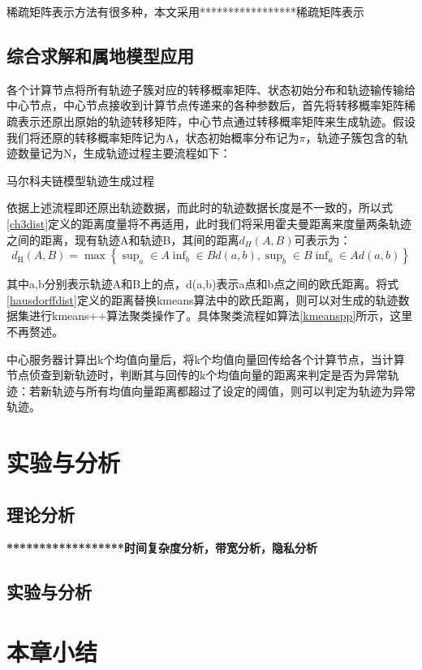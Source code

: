 稀疏矩阵表示方法有很多种，本文采用*****************稀疏矩阵表示


\subsection{综合求解和属地模型应用}
各个计算节点将所有轨迹子簇对应的转移概率矩阵、状态初始分布和轨迹输传输给中心节点，中心节点接收到计算节点传递来的各种参数后，首先将转移概率矩阵稀疏表示还原出原始的轨迹转移矩阵，中心节点通过转移概率矩阵来生成轨迹。假设我们将还原的转移概率矩阵记为A，状态初始概率分布记为$\pi$，轨迹子簇包含的轨迹数量记为N，生成轨迹过程主要流程如下：\\
\begin{algorithm}[H]
	 \caption{马尔科夫链模型轨迹生成过程}
\end{algorithm}

依据上述流程即还原出轨迹数据，而此时的轨迹数据长度是不一致的，所以式\ref{ch3dist}定义的距离度量将不再适用，此时我们将采用霍夫曼距离来度量两条轨迹之间的距离，现有轨迹A和轨迹B，其间的距离$d_H(A,B)$可表示为：
\begin{equation}
\label{hausdorffdist}
d_{\text{H}}\left( A,B \right) =\max \left\{ \mathop{\text{sup}}_a\in A\mathop{\text{inf}}_b\in Bd\left( a,b \right) ,\mathop{\text{sup}}_b\in B\mathop{\text{inf}}_a\in Ad\left( a,b \right) \right\} 
\end{equation}

其中a,b分别表示轨迹A和B上的点，d(a,b)表示a点和b点之间的欧氏距离。将式\ref{hausdorffdist}定义的距离替换kmeans算法中的欧氏距离，则可以对生成的轨迹数据集进行kmeans++算法聚类操作了。具体聚类流程如算法\ref{kmeanspp}所示，这里不再赘述。


中心服务器计算出k个均值向量后，将k个均值向量回传给各个计算节点，当计算节点侦查到新轨迹时，判断其与回传的k个均值向量的距离来判定是否为异常轨迹：若新轨迹与所有均值向量距离都超过了设定的阈值，则可以判定为轨迹为异常轨迹。


\section{实验与分析}

\subsection{理论分析}



\textbf{******************时间复杂度分析，带宽分析，隐私分析}

\subsection{实验与分析}


\section{本章小结}
